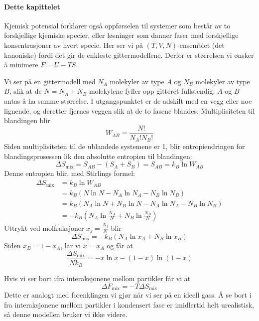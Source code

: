\paragraph{Dette kapittelet} Kjemisk potensial forklarer også oppførselen til systemer som består av to forskjellige kjemiske specier, eller løsninger som danner faser med forskjellige konsentrasjoner av hvert specie. Her ser vi på $(T,V,N)$-ensemblet (det kanoniske) fordi det gir de enkleste gittermodellene. Derfor er størrelsen vi ønsker å minimere $F=U-TS$.

Vi ser på en gittermodell med $N_A$ molekyler av type $A$ og $N_B$ molekyler av type $B$, slik at de $N=N_A+N_B$ molekylene fyller opp gitteret fullstendig. $A$ og $B$ antas å ha samme størrelse. I utgangspunktet er de adskilt med en vegg eller noe lignende, og deretter fjernes veggen slik at de to fasene blandes. Multiplisiteten til blandingen blir 
\begin{equation}
	W_{AB}=\frac{N!}{N_A!N_B!}
\end{equation}
Siden multiplisiteten til de ublandede systemene er 1, blir entropiendringen for blandingsprosessen lik den absolutte entropien til blandingen:
\begin{equation}
	\Delta S_{\text{mix}}=S_{AB}-(S_A+S_B)=S_{AB} = k_B\ln W_{AB}
\end{equation}
Denne entropien blir, med Stirlings formel:
{\small \begin{align}
	\Delta S_{\text{mix}} &=k_B\ln W_{AB} \\ &=k_B(N\ln N-N_A\ln N_A-N_B\ln N_B) \\
	&=k_B(N_A\ln N + N_B \ln N - N_A \ln N_A - N_B\ln N_B) \\
	&=-k_B(N_A\ln\frac{N_A}{N}+N_B\ln\frac{N_B}{N})
\end{align}}
Uttrykt ved molfraksjoner $x_j=\frac{N_j}{N}$ blir 
\begin{equation}
	\Delta S_{\text{mix}} = -k_B(N_A\ln x_A + N_B \ln x_B)
\end{equation}
Siden $x_B=1-x_A$, lar vi $x=x_A$ og får at
\begin{equation}
	\frac{\Delta S_{\text{mix}}}{Nk_B}=-x\ln x-(1-x)\ln(1-x)
\end{equation}

Hvis vi ser bort ifra interaksjonene mellom partikler får vi at
\begin{equation}
	\Delta F_{\text{mix}}=-T\Delta S_{\text{mix}}
\end{equation}
Dette er analogt med forenklingen vi gjør når vi ser på en ideell gass. Å se bort i fra interaksjonene mellom partikler i kondensert fase er imidlertid helt urealistisk, så denne modellen bruker vi ikke videre.

